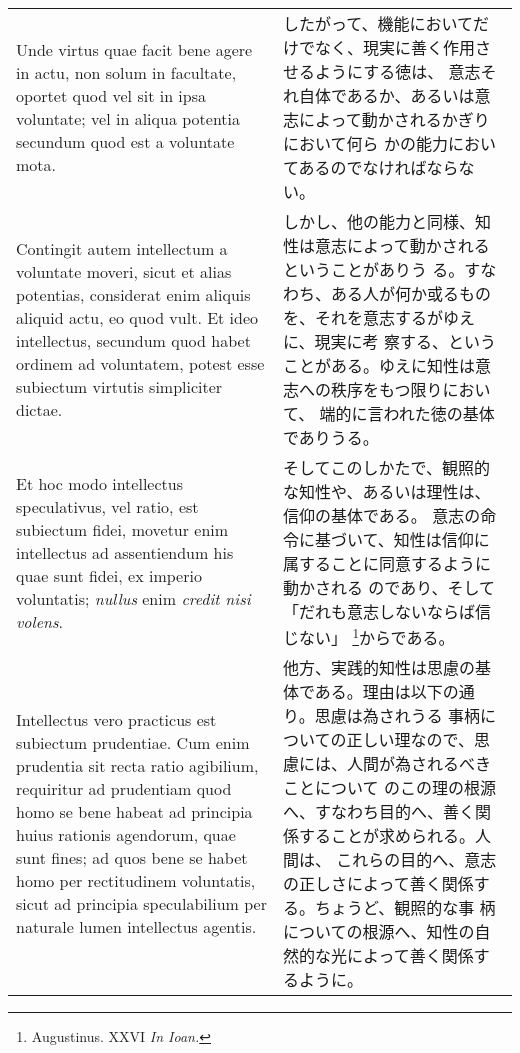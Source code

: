 \documentclass[10pt]{jsarticle}
\begin{document}
\begin{longtable}{p{21em}p{21em}}
 
\\


Unde virtus quae facit bene agere in actu, non solum in facultate,
oportet quod vel sit in ipsa voluntate; vel in aliqua potentia
secundum quod est a voluntate mota.

&

したがって、機能においてだけでなく、現実に善く作用させるようにする徳は、
意志それ自体であるか、あるいは意志によって動かされるかぎりにおいて何ら
かの能力においてあるのでなければならない。

\\


Contingit autem intellectum a voluntate moveri, sicut et alias
potentias, considerat enim aliquis aliquid actu, eo quod vult. Et ideo
intellectus, secundum quod habet ordinem ad voluntatem, potest esse
subiectum virtutis simpliciter dictae.

&

しかし、他の能力と同様、知性は意志によって動かされるということがありう
る。すなわち、ある人が何か或るものを、それを意志するがゆえに、現実に考
察する、ということがある。ゆえに知性は意志への秩序をもつ限りにおいて、
端的に言われた徳の基体でありうる。

\\

Et hoc modo intellectus speculativus, vel ratio, est subiectum fidei,
movetur enim intellectus ad assentiendum his quae sunt fidei, ex
imperio voluntatis; {\itshape nullus} enim {\itshape credit nisi
volens}. 

&

そしてこのしかたで、観照的な知性や、あるいは理性は、信仰の基体である。
意志の命令に基づいて、知性は信仰に属することに同意するように動かされる
のであり、そして「だれも意志しないならば信じない」
\footnote{Augustinus. XXVI {\itshape In Ioan.}}からである。

\\


Intellectus vero practicus est subiectum prudentiae.  Cum enim
prudentia sit recta ratio agibilium, requiritur ad prudentiam quod
homo se bene habeat ad principia huius rationis agendorum, quae sunt
fines; ad quos bene se habet homo per rectitudinem voluntatis, sicut
ad principia speculabilium per naturale lumen intellectus agentis.

&

他方、実践的知性は思慮の基体である。理由は以下の通り。思慮は為されうる
事柄についての正しい理なので、思慮には、人間が為されるべきことについて
のこの理の根源へ、すなわち目的へ、善く関係することが求められる。人間は、
これらの目的へ、意志の正しさによって善く関係する。ちょうど、観照的な事
柄についての根源へ、知性の自然的な光によって善く関係するように。


\end{longtable}
\end{document}
